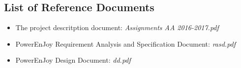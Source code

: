 \subsection{List of Reference Documents}
\begin{itemize}
	\item The project descritption document: \textit{Assignments AA 2016-2017.pdf}
	\item PowerEnJoy Requirement Analysis and Specification Document: \textit{rasd.pdf}
	\item PowerEnJoy Design Document: \textit{dd.pdf}
\end{itemize}

